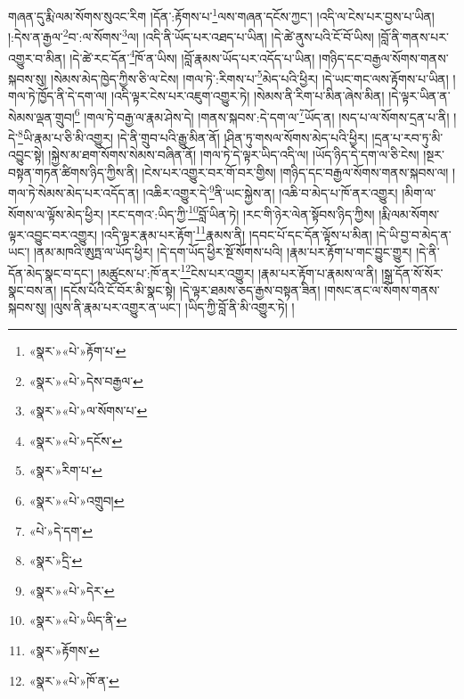 གཞན་དུ་རྨི་ལམ་སོགས་སུའང་རིག །དོན་:རྟོགས་པ་\footnote{«སྣར་»«པེ་»རྟོག་པ་}ལས་གཞན་དངོས་ཀྱང་། །འདི་ལ་ངེས་པར་བྱས་པ་ཡིན། །:དེས་ན་རྒྱལ་\footnote{«སྣར་»«པེ་»དེས་བརྒྱལ་}བ་:ལ་སོགས་\footnote{«སྣར་»«པེ་»ལ་སོགས་པ་}ལ། །འདི་ནི་ཡོད་པར་འཐད་པ་ཡིན། །དེ་ཚེ་ནུས་པའི་ངོ་བོ་ཡིས། །བློ་ནི་གནས་པར་འགྱུར་བ་མིན། །དེ་ཚེ་རང་དོན་\footnote{«སྣར་»«པེ་»དངོས་}ཁོ་ན་ཡིས། །བློ་རྣམས་ཡོད་པར་འདོད་པ་ཡིན། །གཉིད་དང་བརྒྱལ་སོགས་གནས་སྐབས་སུ། །སེམས་མེད་ཁྱེད་ཀྱིས་ཅི་ལ་ངེས། །གལ་ཏེ་:རིགས་པ་\footnote{«སྣར་»རིག་པ་}མེད་པའི་ཕྱིར། །དེ་ཡང་གང་ལས་རྟོགས་པ་ཡིན། །གལ་ཏེ་ཁྱོད་ནི་དེ་དག་ལ། །འདི་ལྟར་ངེས་པར་འཇུག་འགྱུར་ཏེ། །སེམས་ནི་རིག་པ་མིན་ཞེས་མིན། །དེ་ལྟར་ཡིན་ན་སེམས་ལྡན་གྲུབ།\footnote{«སྣར་»«པེ་»འགྲུབ།} །གལ་ཏེ་བརྒྱ་ལ་རྣམ་ཤེས་དེ། །གནས་སྐབས་:དེ་དག་ལ་\footnote{«པེ་»དེ་དག་}ཡོད་ན། །སད་པ་ལ་སོགས་དྲན་པ་ནི། །དེ་\footnote{«སྣར་»དྲི་}ཡི་རྣམ་པ་ཅི་མི་འགྱུར། །དེ་ནི་གྲུབ་པའི་རྒྱུ་མིན་ནོ། །ཤིན་ཏུ་གསལ་སོགས་མེད་པའི་ཕྱིར། །དྲན་པ་རབ་ཏུ་མི་འབྱུང་སྟེ། །སྐྱེས་མ་ཐག་སོགས་སེམས་བཞིན་ནོ། །གལ་ཏེ་དེ་ལྟར་ཡིད་འདི་ལ། །ཡོད་ཉིད་དེ་དག་ལ་ཅི་ངེས། །སྔར་བསྟན་གཏན་ཚིགས་ཉིད་ཀྱིས་ནི། །ངེས་པར་འགྱུར་བར་གོ་བར་གྱིས། །གཉིད་དང་བརྒྱལ་སོགས་གནས་སྐབས་ལ། །གལ་ཏེ་སེམས་མེད་པར་འདོད་ན། །འཆིར་འགྱུར་དེ་\footnote{«སྣར་»«པེ་»དེར་}ནི་ཡང་སྐྱེས་ན། །འཆི་བ་མེད་པ་ཁོ་ནར་འགྱུར། །མིག་ལ་སོགས་ལ་ལྟོས་མེད་ཕྱིར། །རང་དགའ་:ཡིད་ཀྱི་\footnote{«སྣར་»«པེ་»ཡིད་ནི་}བློ་ཡིན་ཏེ། །རང་གི་ཉེར་ལེན་སྟོབས་ཉིད་ཀྱིས། །རྨི་ལམ་སོགས་ལྟར་འབྱུང་བར་འགྱུར། །འདི་ལྟར་རྣམ་པར་རྟོག་\footnote{«སྣར་»རྟོགས་}རྣམས་ནི། །དབང་པོ་དང་དོན་ལྟོས་པ་མིན། །དེ་ཡི་བྱ་བ་མེད་ན་ཡང་། །ནམ་མཁའི་ཨུཏྤ་ལ་ཡོད་ཕྱིར། །དེ་དག་ཡོད་ཕྱིར་སྔོ་སོགས་པའི། །རྣམ་པར་རྟོག་པ་གང་བྱུང་གྱུར། །དེ་ནི་དོན་མེད་སྣང་བ་དང་། །མཚུངས་པ་:ཁོ་ནར་\footnote{«སྣར་»«པེ་»ཁོ་ན་}ངེས་པར་འགྱུར། །རྣམ་པར་རྟོག་པ་རྣམས་ལ་ནི། །སྒྲ་དོན་སོ་སོར་སྣང་བས་ན། །དངོས་པོའི་ངོ་བོར་མི་སྣང་སྟེ། །དེ་ལྟར་ཐམས་ཅད་རྒྱས་བསྟན་ཟིན། །གསང་ནང་ལ་སོགས་གནས་སྐབས་སུ། །ལུས་ནི་རྣམ་པར་འགྱུར་ན་ཡང་། །ཡིད་ཀྱི་བློ་ནི་མི་འགྱུར་ཏེ། །
